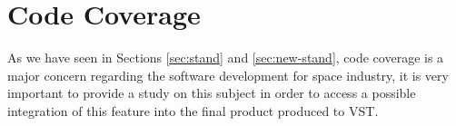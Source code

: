 {\section{Code Coverage}\label{sec:ccoverage}
As we have seen in Sections \ref{sec:stand} and \ref{sec:new-stand}, code coverage is a major concern regarding the software development for space industry,
it is very important to provide a study on this subject
in order to access a possible integration of this feature into the final product produced to \ac{VST}.\\
}

